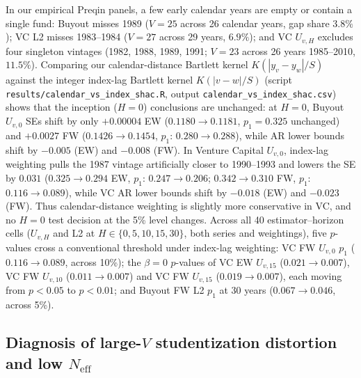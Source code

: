 \begin{remark}
\label{rem:calendar_vs_index_shac}
In our empirical Preqin panels, a few early calendar years are empty or contain a single fund: Buyout misses 1989 ($V=25$ across 26 calendar years, gap share $3.8\%$); VC L2 misses 1983--1984 ($V=27$ across 29 years, $6.9\%$); and VC $U_{v,H}$ excludes four singleton vintages (1982, 1988, 1989, 1991; $V=23$ across 26 years 1985--2010, $11.5\%$).
Comparing our calendar-distance Bartlett kernel $K(|y_v - y_w|/S)$ against the integer index-lag Bartlett kernel $K(|v - w|/S)$ (script \texttt{results/calendar\_vs\_index\_shac.R}, output \texttt{calendar\_vs\_index\_shac.csv}) shows that the inception ($H=0$) conclusions are unchanged:
at $H = 0$, Buyout $U_{v,0}$ SEs shift by only $+0.00004$ EW ($0.1180 \to 0.1181$, $p_1 = 0.325$ unchanged) and $+0.0027$ FW ($0.1426 \to 0.1454$, $p_1$: $0.280 \to 0.288$), while AR lower bounds shift by $-0.005$ (EW) and $-0.008$ (FW).
In Venture Capital $U_{v,0}$, index-lag weighting pulls the 1987 vintage artificially closer to 1990--1993 and lowers the SE by $0.031$ ($0.325 \to 0.294$ EW, $p_1$: $0.247 \to 0.206$; $0.342 \to 0.310$ FW, $p_1$: $0.116 \to 0.089$), while VC AR lower bounds shift by $-0.018$ (EW) and $-0.023$ (FW).
Thus calendar-distance weighting is slightly more conservative in VC, and no $H=0$ test decision at the 5\% level changes. Across all 40 estimator--horizon cells ($U_{v,H}$ and L2 at $H\in\{0,5,10,15,30\}$, both series and weightings), five $p$-values cross a conventional threshold under index-lag weighting: VC FW $U_{v,0}$ $p_1$ ($0.116 \to 0.089$, across 10\%); the $\beta=0$ $p$-values of VC EW $U_{v,15}$ ($0.021 \to 0.007$), VC FW $U_{v,10}$ ($0.011 \to 0.007$) and VC FW $U_{v,15}$ ($0.019 \to 0.007$), each moving from $p<0.05$ to $p<0.01$; and Buyout FW L2 $p_1$ at 30 years ($0.067 \to 0.046$, across 5\%).
\end{remark}

\subsection{Diagnosis of large-$V$ studentization distortion and low $N_{\mathrm{eff}}$}
\label{sec:v400_studentization_app}

